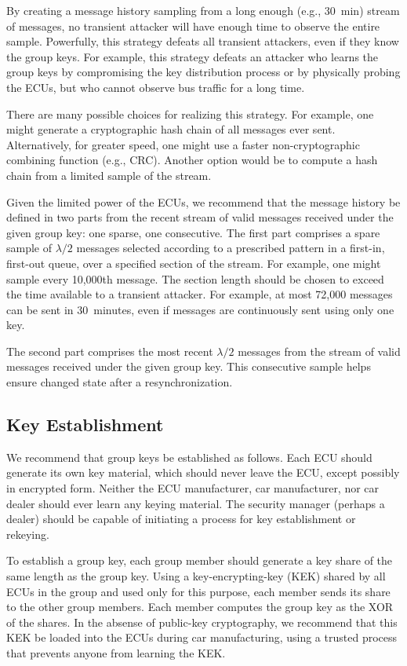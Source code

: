 By creating a message history sampling from a long enough (e.g., 30~min) stream of messages, 
no transient attacker will have enough time to observe the entire sample.
Powerfully, this strategy defeats all transient attackers, even if they know the group keys.
For example, this strategy defeats an attacker who learns the group keys by compromising
the key distribution process or by physically probing the ECUs, but who cannot
observe bus traffic for a long time.

There are many possible choices for realizing this strategy.  For example,
one might generate a cryptographic hash chain of all messages ever sent.  Alternatively, for
greater speed, one might use a faster non-cryptographic combining function (e.g., CRC).  
Another option would be to compute a hash chain from a limited sample of the stream.

Given the limited power of the ECUs, 
we recommend that the message history be defined in two parts from the recent stream of valid messages
received under the given group key: one sparse, one consecutive.  
The first part comprises a spare sample of $\lambda/2$ messages selected 
according to a prescribed pattern in a first-in, first-out queue, 
over a specified section of the stream.  
For example, one might sample every 10,000th message.  
The section length should be chosen to exceed the time available to a transient attacker.
For example, at most 72,000 messages can be sent in 30~minutes,
even if messages are continuously sent using only one key.

The second part comprises the most recent $\lambda/2$ 
messages from the stream of valid messages received under the given group key.
This consecutive sample helps ensure changed state after a resynchronization.

\subsection{Key Establishment}
\label{key}

We recommend that group keys be established as follows.  Each ECU should generate its own key material,
which should never leave the ECU, except possibly in encrypted form.  Neither the ECU manufacturer, car manufacturer, 
nor car dealer should ever learn any keying material.  The security manager (perhaps a dealer) should be capable of initiating
a process for key establishment or rekeying.

To establish a group key, each group member should generate a key share of the same length as the group key.
Using a key-encrypting-key (KEK) shared by all ECUs in the group and used only for this purpose, 
each member sends its share to the other group members.  Each member computes the group key as the
XOR of the shares.  In the absense of public-key cryptography, we recommend that this KEK be
loaded into the ECUs during car manufacturing, using a trusted process that prevents anyone from
learning the KEK.



